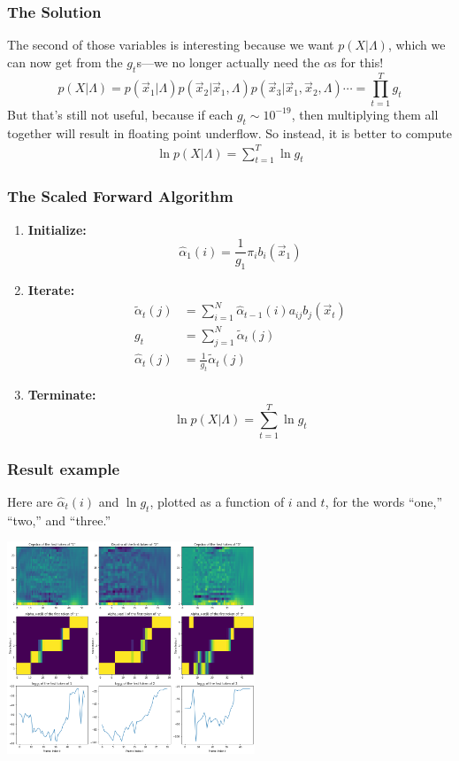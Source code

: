 \documentclass{beamer}
\begin{document}
\begin{frame}
  \frametitle{The Solution}

  The second of those variables is interesting because we want $p(X|\Lambda)$, which
  we can now get from the $g_t$s---we no longer actually need the $\alpha$s for this!
  \begin{displaymath}
    p(X|\Lambda) = p(\vec{x}_1|\Lambda )p(\vec{x}_2|\vec{x}_1,\Lambda)p(\vec{x}_3|\vec{x}_1,\vec{x}_2,\Lambda )\cdots= \prod_{t=1}^T g_t
  \end{displaymath}
  But that's still not useful, because if each $g_t\sim 10^{-19}$,
  then multiplying them all together will result in floating point
  underflow.  So instead, it is better to compute
  \begin{align*}
    \ln p(X|\Lambda) = \sum_{t=1}^T \ln g_t
  \end{align*}
\end{frame}

\begin{frame}
  \frametitle{The Scaled Forward Algorithm}

  \begin{enumerate}
  \item {\bf Initialize:}
    \[
    \hat\alpha_1(i) = \frac{1}{g_1}\pi_i b_i(\vec{x}_1)
    \]
  \item {\bf Iterate:}
    \begin{align*}
      \tilde\alpha_{t}(j) &= \sum_{i=1}^N \hat\alpha_{t-1}(i) a_{ij}b_j(\vec{x}_t)\\
      g_t &= \sum_{j=1}^N \tilde\alpha_t(j)\\
      \hat\alpha_{t}(j) &= \frac{1}{g_t}\tilde\alpha_t(j)
    \end{align*}
  \item {\bf Terminate:}
    \[
    \ln p(X|\Lambda) = \sum_{t=1}^T \ln g_t
    \]
  \end{enumerate}
\end{frame}

\begin{frame}
  \frametitle{Result example}

  Here are $\hat\alpha_t(i)$ and $\ln g_t$, plotted as a function of $i$ and $t$, for
  the words ``one,'' ``two,'' and ``three.''
  \centerline{\includegraphics[height=2.5in]{alphahat.png}}
\end{frame}
\end{document}
